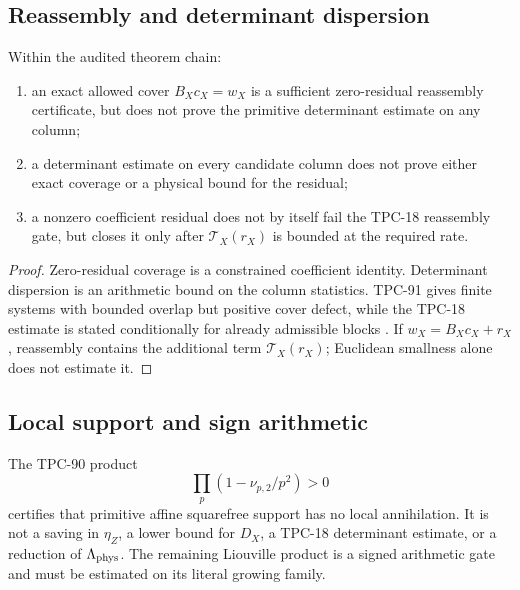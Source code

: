 \subsection{Reassembly and determinant dispersion}

\begin{proposition}
\label{prop:cover-dd-independence}
Within the audited theorem chain:
\begin{enumerate}[label=(\roman*),leftmargin=2.2em]
\item an exact allowed cover \(B_Xc_X=w_X\) is a sufficient
  zero-residual reassembly certificate, but does not prove the
  primitive determinant estimate on any column;
\item a determinant estimate on every candidate column does not prove
  either exact coverage or a physical bound for the residual;
\item a nonzero coefficient residual does not by itself fail the
  TPC-18 reassembly gate, but closes it only after
  \(\mathcal T_X(r_X)\) is bounded at the required rate.
\end{enumerate}
\end{proposition}

\begin{proof}
Zero-residual coverage is a constrained coefficient identity.
Determinant dispersion is an arithmetic bound on the column
statistics.  TPC-91 gives finite systems with bounded overlap but
positive cover defect, while the TPC-18 estimate is stated
conditionally for already admissible blocks
\citep{WangTPC18,WangTPC91}.  If
\(w_X=B_Xc_X+r_X\), reassembly contains the additional term
\(\mathcal T_X(r_X)\); Euclidean smallness alone does not estimate it.
\end{proof}

\subsection{Local support and sign arithmetic}

The TPC-90 product
\[
 \prod_p(1-\nu_{p,2}/p^2)>0
\]
certifies that primitive affine squarefree support has no local
annihilation.  It is not a saving in \(\eta_Z\), a lower bound for
\(D_X\), a TPC-18 determinant estimate, or a reduction of
\(\Lambda_{\rm phys}\).  The remaining Liouville product is a signed
arithmetic gate and must be estimated on its literal growing family.

